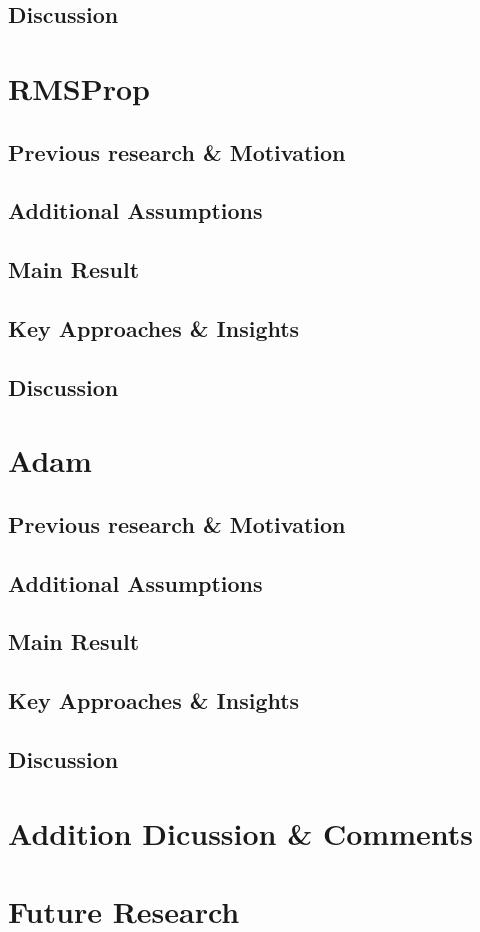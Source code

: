 \documentclass{article}
\begin{document}
\subsection{Discussion}
\newpage
\section{RMSProp}
\subsection{Previous research \& Motivation}
\subsection{Additional Assumptions}
\subsection{Main Result}
\subsection{Key Approaches \& Insights}
\subsection{Discussion}
\newpage
\section{Adam}
\subsection{Previous research \& Motivation}
\subsection{Additional Assumptions}
\subsection{Main Result}
\subsection{Key Approaches \& Insights}
\subsection{Discussion}
\newpage
\section{Addition Dicussion \& Comments}
\section{Future Research}
\newpage


%
\end{document}
